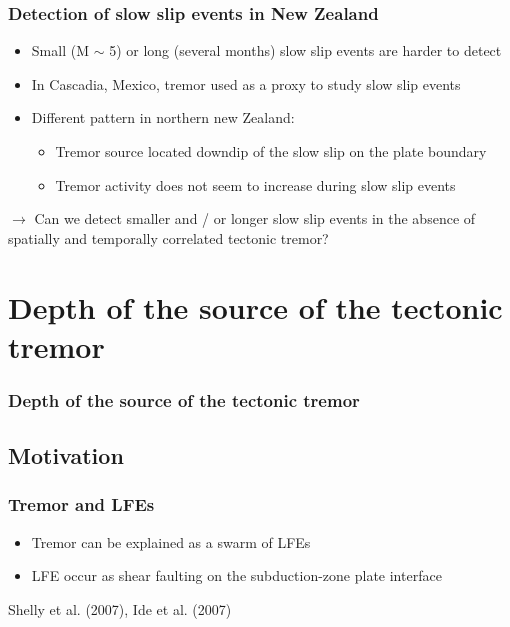 \documentclass{beamer}
\begin{document}
	\begin{frame}
		\frametitle{Detection of slow slip events in New Zealand}
		\begin{itemize}
			\item Small (M $\sim$ 5) or long (several months) slow slip events are harder to detect
			\item In Cascadia, Mexico, tremor used as a proxy to study slow slip events
			\item Different pattern in northern new Zealand:
			\begin{itemize}
				\item Tremor source located downdip of the slow slip on the plate boundary
				\item Tremor activity does not seem to increase during slow slip events
			\end{itemize}
		\end{itemize}

		\begin{block}{}
			$\rightarrow$ Can we detect smaller and / or longer slow slip events in the absence of spatially and temporally correlated tectonic tremor?
		\end{block}			
	\end{frame}

				
	\section{Depth of the source of the tectonic tremor}

	\begin{frame}
		\frametitle{Depth of the source of the tectonic tremor}
	\end{frame}

	\subsection{Motivation}

	\begin{frame}
		\frametitle{Tremor and LFEs}
		\begin{itemize}
			\item Tremor can be explained as a swarm of LFEs
			\item LFE occur as shear faulting on the subduction-zone plate interface
		\end{itemize}

		Shelly et al. (2007), Ide et al. (2007)
	\end{frame}
\end{document}
